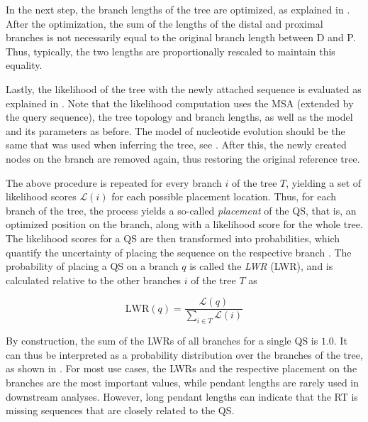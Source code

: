 In the next step, the branch lengths of the tree are optimized,
as explained in .
After the optimization, the sum of the lengths of the distal and proximal branches is not necessarily equal
to the original branch length between {\sffamily D} and {\sffamily P}.
Thus, typically, the two lengths are proportionally rescaled to maintain this equality.

Lastly, the likelihood of the tree with the newly attached sequence is evaluated
as explained in .
Note that the likelihood computation uses the MSA (extended by the query sequence),
the tree topology and branch lengths, as well as the model and its parameters as before.
The model of nucleotide evolution should be the same that was used when inferring the tree,
see .
After this, the newly created nodes on the branch are removed again, thus restoring the original reference tree.

The above procedure is repeated for every branch $i$ of the tree $T$,
yielding a set of likelihood scores $\mathcal{L}(i)$ for each possible placement location.
Thus, for each branch of the tree, the process yields a so-called \emph{placement} of the \ac{QS},
that is, an optimized position on the branch, along with a likelihood score for the whole tree.
The likelihood scores for a \ac{QS} are then transformed into probabilities,
which quantify the uncertainty of placing the sequence on the respective branch \cite{Strimmer2002,VonMering2007}.
The probability of placing a \ac{QS} on a branch $q$ is called the \emph{\acl{LWR}} (\acs{LWR}),
and is calculated relative to the other branches $i$ of the tree $T$ as

\begin{equation}
    \label{ch:Foundations:sec:PhylogeneticPlacement:eq:LWR}
    \mbox{LWR}(q) =  \frac{ \mathcal{L}( q )}{ \sum_{i \in T} \mathcal{L}( i )}
\end{equation}

By construction, the sum of the \acp{LWR} of all branches for a single \ac{QS} is $1.0$.
It can thus be interpreted as a probability distribution over the branches of the tree,
as shown in .
For most use cases, the \acp{LWR} and the respective placement on the branches are the most important values,
while pendant lengths are rarely used in downstream analyses.
However, long pendant lengths can indicate that the \ac{RT} is missing sequences that are closely related to the \ac{QS}.

